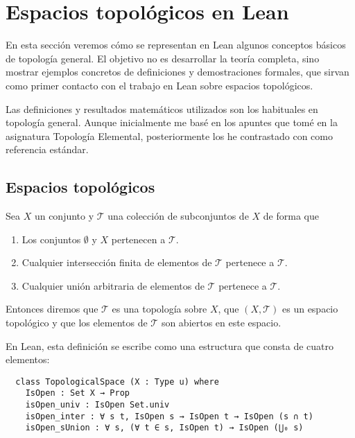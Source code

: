 \section{Espacios topológicos en Lean}

En esta sección veremos cómo se representan en Lean algunos conceptos básicos de topología general. El objetivo no es desarrollar la teoría completa, sino mostrar ejemplos concretos de definiciones y demostraciones formales, que sirvan como primer contacto con el trabajo en Lean sobre espacios topológicos.

Las definiciones y resultados matemáticos utilizados son los habituales en topología general. Aunque inicialmente me basé en los apuntes que tomé en la asignatura Topología Elemental, posteriormente los he contrastado con \cite{willard2012general} como referencia estándar.

\subsection{Espacios topológicos}

\begin{definition}\label{def:espacio-topologico}
    Sea $X$ un conjunto y $\mathcal{T}$ una colección de subconjuntos de $X$ de forma que
    \begin{enumerate}
      \item Los conjuntos $\emptyset$ y $X$ pertenecen a $\mathcal{T}$.
      \item Cualquier intersección finita de elementos de $\mathcal{T}$ pertenece a $\mathcal{T}$.
      \item Cualquier unión arbitraria de elementos de $\mathcal{T}$ pertenece a $\mathcal{T}$.
    \end{enumerate}
    Entonces diremos que $\mathcal{T}$ es una \textnormal{topología} sobre $X$, que $(X, \mathcal{T})$ es un \textnormal{espacio topológico} y que los elementos de $\mathcal{T}$ son \textnormal{abiertos} en este espacio.
\end{definition}

En Lean, esta definición se escribe como una estructura que consta de cuatro elementos:

\begin{lstlisting}
  class TopologicalSpace (X : Type u) where
    IsOpen : Set X → Prop
    isOpen_univ : IsOpen Set.univ
    isOpen_inter : ∀ s t, IsOpen s → IsOpen t → IsOpen (s ∩ t)
    isOpen_sUnion : ∀ s, (∀ t ∈ s, IsOpen t) → IsOpen (⋃₀ s)
\end{lstlisting}

